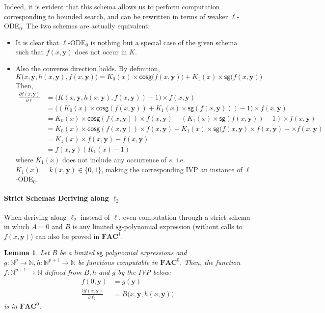 \documentclass[11pt, oneside]{article}
\newcommand{\fun}[1]{\mathsf{#1}}
\newcommand{\sB}{B}
\newcommand{\Nat}{\mathbb{N}}
\newcommand{\AC}{\mathbf{FAC}}
\newcommand{\tu}[1]{\mathbf{#1}}
\newtheorem{lemma}{Lemma}
\theoremstyle{definition}
\begin{document}
{Indeed, it is evident that this schema allows us to perform computation corresponding to bounded search, and can be rewritten in terms of weaker $\ell$-ODE$_0$.
The two schemas are actually equivalent:
\begin{itemize}
    \itemsep0em
    \item It is clear that $\ell$-ODE$_0$ is nothing but a special case of the given schema such that $f(x, \tu y)$ does not occur in $K$.
    \item Also the converse direction holds.
    By definition, 
    $$
    K\big(x, \tu y, h(x, \tu y), f(x, \tu y)\big) = K_0(x) \times \fun{cosg}\big(f(x, \tu y)\big) + K_1(x) \times \fun{sg}\big(f(x, \tu y)\big) 
    $$
    Then,
    \begin{align*}
        \frac{\partial f(x,\tu y)}{\partial \ell} &= \big(K(x, \tu y, h(x, \tu y), f(x, \tu y)) - 1\big) \times f(x, \tu y) \\
        &= \big((K_0(x) \times \fun{cosg}(f(x, \tu y)) + K_1(x) \times \fun{sg}(f(x,\tu y)))-1\big) \times f(x, \tu y) \\
        &= K_0(x) \times \fun{cosg}(f(x, \tu y)) \times f(x, \tu y) + (K_1(x) \times \fun{sg}(f(x, \tu y))-1) \times f(x, \tu y) \\
        &= K_0(x) \times \fun{cosg}(f(x, \tu y)) \times f(x, \tu y) + K_1(x) \times \fun{sg}(f(x, \tu y)\times f(x, \tu y) - \times f(x, \tu y)
        \\
        &= K_1(x) \times f(x, \tu y) - f(x, \tu y) \\
        &= f(x, \tu y) (K_1(x)-1)
    \end{align*}
    where $K_1(x)$ does not include any occurrence of $s$, i.e. $K_1(x) = k(x, \tu y) \in \{0,1\}$, making the corresponding IVP an instance of $\ell$-ODE$_0$.
\end{itemize}

\paragraph{Strict Schemas Deriving along $\ell_2$}

When deriving along $\ell_2$ instead of $\ell$, even computation through a strict schema in which $A=0$ and $B$ is any limited $\fun{sg}$-polynomial expression (without calls to $f(x, \tu y)$) can also be proved in $\AC^1$.

\begin{lemma}\label{lemma:logitadd}
    Let $\sB$ be a limited $\fun{sg}$ polynomial expressions and $g:\Nat^{p} \to \Nat, h:\Nat^{p+1}\to \Nat$ be functions computable in $\AC^0$.
    Then, the function $f:\Nat^{p+1} \to \Nat$ defined from $\sB, h$ and $g$ by the IVP below:
    \begin{align*}
        f(0, \tu y) &= g(\tu y) \\
        \frac{\partial f(x, \tu y)}{\partial \ell_2} &= \sB\big(x, \tu y, h(x, \tu y)\big)
    \end{align*}
    is in $\AC^0$.
\end{lemma}

}
\end{document}

